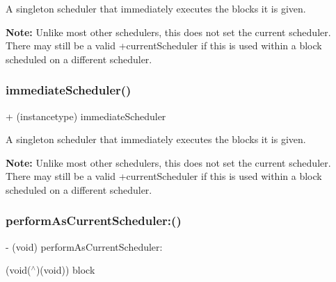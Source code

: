 A singleton scheduler that immediately executes the blocks it is given.

{\bfseries Note\+:} Unlike most other schedulers, this does not set the current scheduler. There may still be a valid +current\+Scheduler if this is used within a block scheduled on a different scheduler. \mbox{\label{interface_r_a_c_scheduler_aec2dc59d7f2bd10dc318429167154821}} 
\subsubsection{\texorpdfstring{immediate\+Scheduler()}{immediateScheduler()}\hspace{0.1cm}{\footnotesize\ttfamily [3/3]}}
{\footnotesize\ttfamily + (instancetype) immediate\+Scheduler \begin{DoxyParamCaption}{ }\end{DoxyParamCaption}}

A singleton scheduler that immediately executes the blocks it is given.

{\bfseries Note\+:} Unlike most other schedulers, this does not set the current scheduler. There may still be a valid +current\+Scheduler if this is used within a block scheduled on a different scheduler. \mbox{\label{interface_r_a_c_scheduler_a2aaec93a6a9e3dbe316ee320a312ca2e}} 
\subsubsection{\texorpdfstring{perform\+As\+Current\+Scheduler\+:()}{performAsCurrentScheduler:()}\hspace{0.1cm}{\footnotesize\ttfamily [1/3]}}
{\footnotesize\ttfamily -\/ (void) perform\+As\+Current\+Scheduler\+: \begin{DoxyParamCaption}\item[{(void($^\wedge$)(void))}]{block }\end{DoxyParamCaption}\hspace{0.3cm}{\ttfamily [implementation]}}

